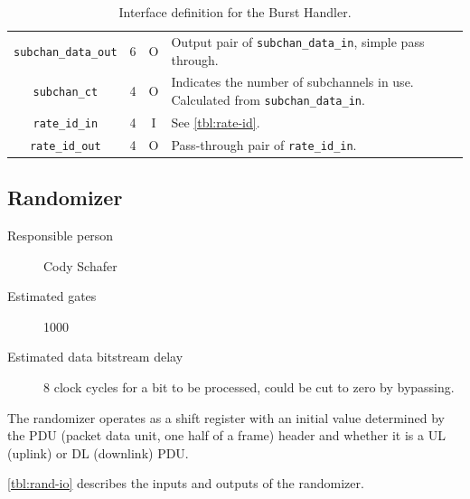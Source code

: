 \documentclass[dvips,10pt,twocolumn]{article}
\newcommand{\wire}{\texttt}
\begin{document}
\begin{table}
\begin{tabularx}{\textwidth}{c|c|c|X}
	\wire{subchan\_data\_out} & 6 & O & Output pair of
	\wire{subchan\_data\_in}, simple pass through. \\

	\wire{subchan\_ct} & 4 & O & Indicates the number of subchannels in
	use. Calculated from \wire{subchan\_data\_in}. \\

	\wire{rate\_id\_in} & 4 & I  & See \autoref{tbl:rate-id}. \\

	\wire{rate\_id\_out} & 4 & O & Pass-through pair of
	\wire{rate\_id\_in}. \\

\end{tabularx}
\caption{Interface definition for the Burst Handler.}
\end{table}


\subsection{Randomizer}
\label{sec:rand}
\begin{description}
	\item[Responsible person] Cody Schafer 
	\item[Estimated gates] 1000
	\item[Estimated data bitstream delay] 8 clock cycles for a bit to be
		processed, could be cut to zero by bypassing.
\end{description}

The randomizer operates as a shift register with an initial value
determined by the PDU (packet data unit, one half of a frame) header
and whether it is a UL (uplink) or DL (downlink) PDU.

\autoref{tbl:rand-io} describes the inputs and outputs of the
randomizer.
\end{document}
